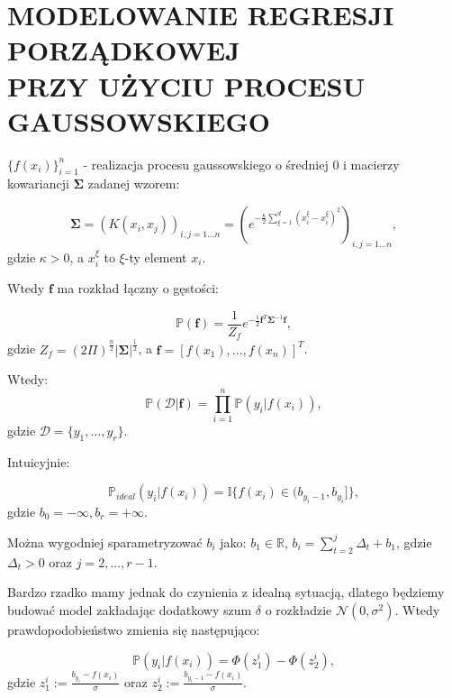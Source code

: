 \documentclass[12pt,a4paper]{article}
\begin{document}

\section*{\centering MODELOWANIE REGRESJI PORZĄDKOWEJ \\PRZY UŻYCIU PROCESU GAUSSOWSKIEGO}

$\lbrace f(x_i) \rbrace_{i=1}^{n}$ - realizacja procesu gaussowskiego o średniej $0$ i macierzy kowariancji $\mathbf{\Sigma}$ zadanej wzorem:

$$
\mathbf{\Sigma} = \left( K(x_i, x_j) \right)_{i, j=1\ldots n} = \left(e^{-\frac{\kappa}{2}\sum_{\xi=1}^{d}(x_i^\xi-x_i^\xi)^2}\right)_{i, j=1\ldots n},
$$
gdzie  $\kappa>0$, a $x_i^\xi$ to $\xi$-ty element $x_i$.

Wtedy $\mathbf{f}$ ma rozkład łączny o gęstości:

$$
\mathbb{P}(\mathbf{f})=\frac{1}{Z_f}e^{-\frac{1}{2}\mathbf{f}^T\mathbf{\Sigma}^{-1}\mathbf{f}}, 
$$
gdzie $Z_f=(2\Pi)^{\frac{n}{2}}|\mathbf{\Sigma}|^\frac{1}{2}$, a $\mathbf{f}=[f(x_1),\ldots,f(x_n)]^T$.

Wtedy:
$$
\mathbb{P}(\mathcal{D}|\mathbf{f}) = \prod_{i=1}^n\mathbb{P}(y_i|f(x_i)),
$$
gdzie $\mathcal{D} = \lbrace y_1, \ldots, y_r \rbrace$.

Intuicyjnie:

$$
\mathbb{P}_{ideal} (y_i|f(x_i)) = \mathbb{I}\lbrace f(x_i)\in (b_{y_i-1}, b_{y_i}] \rbrace,
$$
gdzie $b_0=-\infty, b_r=+\infty$. 

Można wygodniej sparametryzować $b_i$ jako: $b_1\in\mathbb{R}$, $b_i = \sum_{t=2}^j\Delta_t+b_1$, gdzie $\Delta_t>0$ oraz $j=2, \ldots, r-1$. 

Bardzo rzadko mamy jednak do czynienia z idealną sytuacją, dlatego będziemy budować model zakładając dodatkowy szum $\delta$ o rozkładzie $\mathcal{N}(0, \sigma^2)$. Wtedy prawdopodobieństwo zmienia się następująco:

$$
\mathbb{P} (y_i|f(x_i)) = \Phi\left( z_1^i \right) - \Phi\left( z_2^i \right),
$$
gdzie $z_1^i :=\frac{b_{y_i}-f(x_i)}{\sigma} $ oraz $z_2^i :=\frac{b_{y_i-1}-f(x_i)}{\sigma} $.
\\
\end{document}
